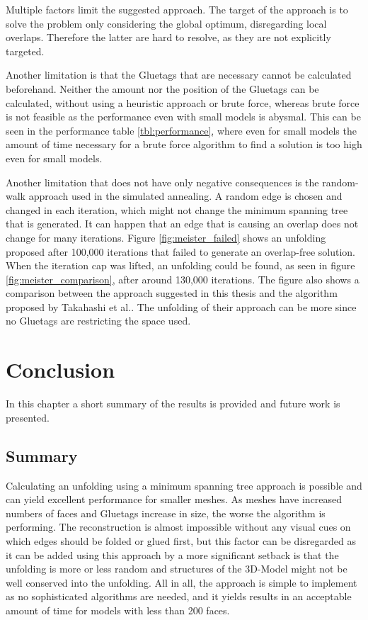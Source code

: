 \documentclass[draft,final]{vutinfth} %
\begin{document}
Multiple factors limit the suggested approach. The target of the approach is to solve the problem only considering the global optimum, disregarding local overlaps. Therefore the latter are hard to resolve, as they are not explicitly targeted.

Another limitation is that the Gluetags that are necessary cannot be calculated beforehand. Neither the amount nor the position of the Gluetags can be calculated, without using a heuristic approach or brute force, whereas brute force is not feasible as the performance even with small models is abysmal. This can be seen in the performance table \ref{tbl:performance}, where even for small models the amount of time necessary for a brute force algorithm to find a solution is too high even for small models. 

Another limitation that does not have only negative consequences is the random-walk approach used in the simulated annealing. A random edge is chosen and changed in each iteration, which might not change the minimum spanning tree that is generated. It can happen that an edge that is causing an overlap does not change for many iterations. Figure \ref{fig:meister_failed} shows an unfolding proposed after 100,000 iterations that failed to generate an overlap-free solution. When the iteration cap was lifted, an unfolding could be found, as seen in figure \ref{fig:meister_comparison}, after around 130,000 iterations. The figure also shows a comparison between the approach suggested in this thesis and the algorithm proposed by Takahashi et al.\cite{takahashi2011optimized}. The unfolding of their approach can be more since no Gluetags are restricting the space used.

\chapter{Conclusion}
\label{chap:conclusion}
In this chapter a short summary of the results is provided and future work is presented.

\section{Summary}
Calculating an unfolding using a minimum spanning tree approach is possible and can yield excellent performance for smaller meshes. As meshes have increased numbers of faces and Gluetags increase in size, the worse the algorithm is performing. The reconstruction is almost impossible without any visual cues on which edges should be folded or glued first, but this factor can be disregarded as it can be added using this approach by a more significant setback is that the unfolding is more or less random and structures of the 3D-Model might not be well conserved into the unfolding. All in all, the approach is simple to implement as no sophisticated algorithms are needed, and it yields results in an acceptable amount of time for models with less than 200 faces.
\end{document}
